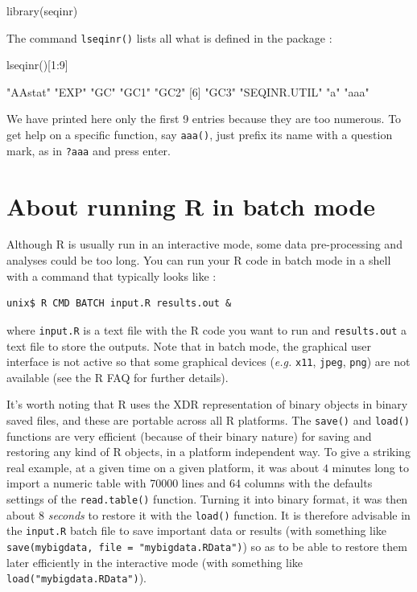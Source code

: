 \documentclass{article}
\begin{document}
\begin{Schunk}
\begin{Sinput}
library(seqinr)
\end{Sinput}
\end{Schunk}

The command \texttt{lseqinr()} lists all what is defined in the package \seqinr{}:

\begin{Schunk}
\begin{Sinput}
 lseqinr()[1:9]
\end{Sinput}
\begin{Soutput}
[1] "AAstat"      "EXP"         "GC"          "GC1"         "GC2"        
[6] "GC3"         "SEQINR.UTIL" "a"           "aaa"        
\end{Soutput}
\end{Schunk}

We have printed here only the first 9 entries because they are too numerous.
To get help on a specific function, say \texttt{aaa()}, just prefix its name
with a question mark, as in \texttt{?aaa} and press enter.

\section{About running R in batch mode}

Although R is usually run in an interactive mode, some data pre-processing 
and analyses could be too long. You can run your R code in batch mode
in a shell with a command that typically looks like :

\begin{verbatim}
unix$ R CMD BATCH input.R results.out &
\end{verbatim}

where \texttt{input.R} is a text file with the R code you want to run and
\texttt{results.out} a text file to store the outputs. Note that in batch mode,
the graphical user interface is not active so that some graphical devices 
(\textit{e.g.} \texttt{x11}, \texttt{jpeg}, \texttt{png}) are not
available (see the R FAQ \cite{RFAQ} for further details).

It's worth noting that R uses the XDR representation of binary objects in binary saved files, 
and these are portable across all R platforms. The \texttt{save()} and \texttt{load()}
functions are very efficient (because of their binary nature) for saving and restoring any 
kind of R objects, in a platform independent way. To give a striking real example, at a given time
on a given platform, it was about $4$ minutes long to import a numeric table with 70000 lines and 64 columns
with the defaults settings of the \texttt{read.table()} function. Turning it into binary format,
it was then about $8$ \emph{seconds} to restore it with the \texttt{load()} function.
It is therefore advisable in the \texttt{input.R} batch file to save important data or
results (with something like \texttt{save(mybigdata, file = "mybigdata.RData")})
so as to be able to restore them later efficiently in the interactive mode (with something
like \texttt{load("mybigdata.RData")}).
\end{document}
